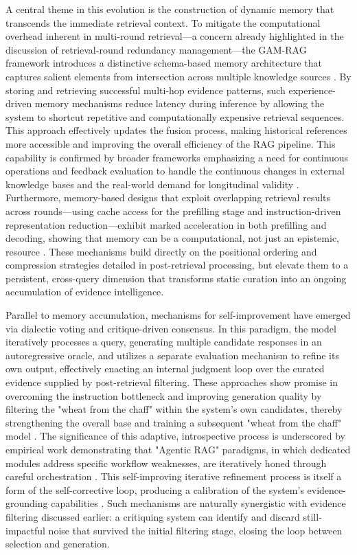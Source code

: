 \documentclass[11pt,a4paper]{article}
\begin{document}
A central theme in this evolution is the construction of dynamic memory that transcends the immediate retrieval context. To mitigate the computational overhead inherent in multi-round retrieval---a concern already highlighted in the discussion of retrieval-round redundancy management---the GAM-RAG framework introduces a distinctive schema-based memory architecture that captures salient elements from intersection across multiple knowledge sources \cite{arxiv:2506.20869v3}. By storing and retrieving successful multi-hop evidence patterns, such experience-driven memory mechanisms reduce latency during inference by allowing the system to shortcut repetitive and computationally expensive retrieval sequences. This approach effectively updates the fusion process, making historical references more accessible and improving the overall efficiency of the RAG pipeline. This capability is confirmed by broader frameworks emphasizing a need for continuous operations and feedback evaluation to handle the continuous changes in external knowledge bases and the real-world demand for longitudinal validity \cite{arxiv:2506.03401v1}. Furthermore, memory-based designs that exploit overlapping retrieval results across rounds---using cache access for the prefilling stage and instruction-driven representation reduction---exhibit marked acceleration in both prefilling and decoding, showing that memory can be a computational, not just an epistemic, resource \cite{arxiv:2505.12731v2}. These mechanisms build directly on the positional ordering and compression strategies detailed in post-retrieval processing, but elevate them to a persistent, cross-query dimension that transforms static curation into an ongoing accumulation of evidence intelligence.

Parallel to memory accumulation, mechanisms for self-improvement have emerged via dialectic voting and critique-driven consensus. In this paradigm, the model iteratively processes a query, generating multiple candidate responses in an autoregressive oracle, and utilizes a separate evaluation mechanism to refine its own output, effectively enacting an internal judgment loop over the curated evidence supplied by post-retrieval filtering. These approaches show promise in overcoming the instruction bottleneck and improving generation quality by filtering the "wheat from the chaff" within the system's own candidates, thereby strengthening the overall base and training a subsequent "wheat from the chaff" model \cite{arxiv:2504.20119v2}. The significance of this adaptive, introspective process is underscored by empirical work demonstrating that "Agentic RAG" paradigms, in which dedicated modules address specific workflow weaknesses, are iteratively honed through careful orchestration \cite{arxiv:2601.07711v2}. This self-improving iterative refinement process is itself a form of the self-corrective loop, producing a calibration of the system's evidence-grounding capabilities \cite{arxiv:2506.10408v1}. Such mechanisms are naturally synergistic with evidence filtering discussed earlier: a critiquing system can identify and discard still-impactful noise that survived the initial filtering stage, closing the loop between selection and generation.
\end{document}
